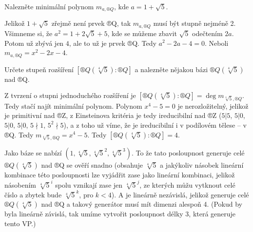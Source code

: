 \documentclass[12pt]{article}                   %
\begin{document}
    \begin{priklad}[6.3]
        Nalezněte minimální polynom $m_{a, ®Q}$, kde $a = 1 + \sqrt{5}$.

        \begin{reseni}
            Jelikož $1 + \sqrt{5}$ zřejmě není prvek ®Q, tak $m_{a, ®Q}$ musí být stupně nejméně 2. Všimneme si, že $a^2 = 1 + 2\sqrt{5} + 5$, kde se můžeme zbavit $\sqrt{5}$ odečtením $2a$. Potom už zbývá jen $4$, ale to už je prvek ®Q. Tedy $a^2 - 2a - 4 = 0$. Neboli $m_{a, ®Q} = x^2 - 2x - 4$.
        \end{reseni}
    \end{priklad}

    \begin{priklad}[6.4]
        Určete stupeň rozšíření $[®Q(\sqrt[4]{5}):®Q]$ a nalezněte nějakou bázi $®Q(\sqrt[4]{5})$ nad ®Q.

        \begin{reseni}
            Z tvrzení o stupni jednoduchého rozšíření je $[®Q(\sqrt[4]{5}):®Q] = \deg m_{\sqrt[4]{5}, ®Q}$. Tedy stačí najít minimální polynom. Polynom $x^4 - 5 = 0$ je nerozložitelný, jelikož je primitivní nad ®Z, z Einsteinova kritéria je tedy ireducibilní nad ®Z ($5|5$, $5|0$, $5|0$, $5|0$, $5\nmid 1$, $5^2\nmid 5$), a z toho už víme, že je ireducibilní i v podílovém tělese -- v ®Q. Tedy $m_{\sqrt[4]{5}, ®Q} = x^4 - 5$. Tedy $[®Q(\sqrt[4]{5}):®Q]=4$.

            Jako báze se nabízí $(1, \sqrt[4]{5}, \sqrt[4]{5}^2, \sqrt[4]{5}^3)$. To že tato posloupnost generuje celé $®Q(\sqrt[4]{5})$ nad ®Q se ověří snadno (obsahuje $\sqrt[4]{5}$ a jakýkoliv násobek lineární kombinace této posloupnosti lze vyjádřit zase jako lineární kombinaci, jelikož násobením $\sqrt[4]{5}^i$ spolu vznikají zase jen $\sqrt[4]{5}^j$, ze kterých můžu vytknout celé číslo a zbytek bude $\sqrt[4]{5}^k$, pro $k < 4$). A je lineárně nezávislá, jelikož generuje celé $®Q(\sqrt[4]{5})$ nad ®Q a takový generátor musí mít dimenzi alespoň 4. (Pokud by byla lineárně závislá, tak umíme vytvořit posloupnost délky 3, která generuje tento VP.)
        \end{reseni}
    \end{priklad}
\end{document}
